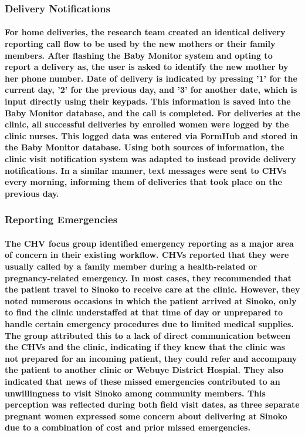 \subsubsection{Delivery Notifications}

\paragraph{For home deliveries, the research team created an identical delivery reporting call flow to be used by the new mothers or their family members. After flashing the Baby Monitor system and opting to report a delivery as, the user is asked to identify the new mother by her phone number. Date of delivery is indicated by pressing '1' for the current day, '2' for the previous day, and '3' for another date, which is input directly using their keypads. This  information is saved into the Baby Monitor database, and the call is completed. For deliveries at the clinic, all successful deliveries by enrolled women were logged by the clinic nurses. This logged data was entered via FormHub and stored in the Baby Monitor database. Using both sources of information, the clinic visit notification system was adapted to instead provide delivery notifications. In a similar manner, text messages were sent to CHVs every morning, informing them of deliveries that took place on the previous day.} 


\subsubsection{Reporting Emergencies}
\paragraph{The CHV focus group identified emergency reporting as a major area of concern in their existing workflow. CHVs reported that they were usually called by a family member during a health-related or pregnancy-related emergency. In most cases, they recommended that the patient travel to Sinoko to receive care at the clinic. However, they noted numerous occasions in which the patient arrived at Sinoko, only to find the clinic understaffed at that time of day or unprepared to handle certain emergency procedures due to limited medical supplies. The group attributed this to a lack of direct communication between the CHVs and the clinic, indicating if they knew that the clinic was not prepared for an incoming patient, they could refer and accompany the patient to another clinic or Webuye District Hospial. They also indicated that news of these missed emergencies contributed to an unwillingness to visit Sinoko among community members. This perception was reflected during both field visit dates, as three separate pregnant women expressed some concern about delivering at Sinoko due to a combination of cost and prior missed emergencies.}

